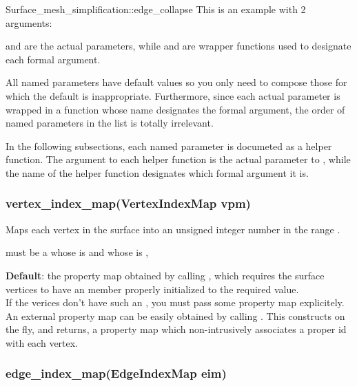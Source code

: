 \begin{ccRefFunction}{Surface_mesh_simplification::edge_collapse}
This is an example with 2 arguments:


 and  are
the actual parameters, while  and 
are wrapper functions used to designate each formal argument.

All named parameters have default values so you only need to compose those for which the default
is inappropriate. Furthermore, since each actual parameter is wrapped in a function whose name
designates the formal argument, the order of named parameters in the list is totally irrelevant.

In the following subsections, each named parameter is documeted as a helper function. The argument to each helper
function is the actual parameter to , while the name of the helper 
function designates which formal argument it is.

\subsubsection*{vertex\_index\_map(VertexIndexMap vpm)}

Maps each vertex in the surface into an unsigned integer number
in the range \ccc{[0,num_vertices(surface))}.

 must be a
whose  is
and whose  is 
,

\textbf{Default}: the property map obtained by calling ,
which requires the surface vertices to have an  member properly initialized to the 
required value.\\
If the verices don't have such an , you must pass some property map explicitely.
An external property map can be easily obtained by calling 
. This constructs on the fly, and returns,
a property map which non-intrusively associates a proper id with each vertex.

\subsubsection*{edge\_index\_map(EdgeIndexMap eim)} 


\end{ccRefFunction}
